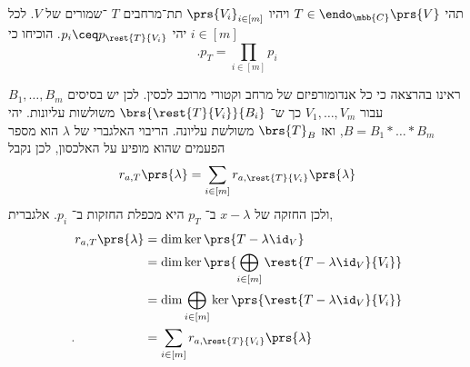 \documentclass[a4paper,10pt,oneside,openany]{article}
\begin{document}
\begin{exercise}
תהי
$T \in \endo_{\mbb{C}}\prs{V}$
ויהיו
$\prs{V_i}_{i \in [m]}$
תת־מרחבים
$T$%
־שמורים של
$V$.
לכל
$i \in [m]$
יהי
$p_i \ceq p_{\rest{T}{V_i}}$.
הוכיחו כי
\[\text{.} p_T = \prod_{i \in [m]} p_i\]
\end{exercise}

\begin{solution}
ראינו בהרצאה כי כל אנדומורפיזם של מרחב וקטורי מרוכב לכסין. לכן יש בסיסים
$B_1, \ldots, B_m$
עבור
$V_1, \ldots, V_m$
כך ש־%
$\brs{\rest{T}{V_i}}{B_i}$
משולשות עליונות.
יהי
$B = B_1 * \ldots * B_m$,
ואז
$\brs{T}_B$
משולשת עליונה.
הריבוי האלגברי של
$\lambda$
הוא מספר הפעמים שהוא מופיע על האלכסון, לכן נקבל
\begin{align*}
r_{a,T}\prs{\lambda} = \sum_{i \in [m]} r_{a,\rest{T}{V_i}}\prs{\lambda}
\end{align*}
ולכן החזקה של
$x-\lambda$
ב־%
$p_T$
היא מכפלת החזקות ב־%
$p_i$.
אלגברית,
\begin{align*}
r_{a,T}\prs{\lambda} &= \dim \ker \prs{T - \lambda \id_V}
\\&= \dim \ker \prs{\bigoplus_{i \in [m]} \rest{T - \lambda \id_V}{V_i}}
\\&= \dim \bigoplus_{i \in [m]} \ker\prs{\rest{T - \lambda \id_V}{V_i}}
\\ \text{.} \hphantom{r_{a,T}\prs{\lambda}} &= \sum_{i \in [m]} r_{a,\rest{T}{V_i}}\prs{\lambda}
\end{align*}
\end{solution}
\end{document}
